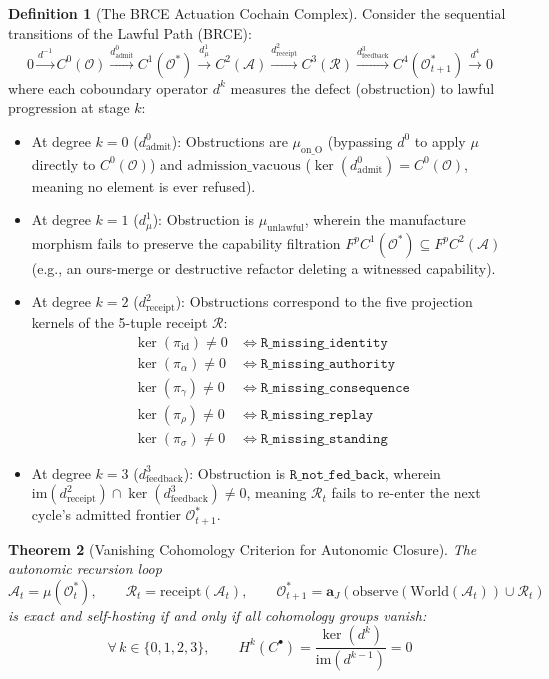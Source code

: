 \documentclass[10pt,twoside,openany]{book}
\theoremstyle{plain}
\newtheorem{theorem}{Theorem}[chapter]
\theoremstyle{definition}
\newtheorem{definition}[theorem]{Definition}
\theoremstyle{remark}
\newcommand{\Oraw}{\mathcal{O}}
\newcommand{\Oadm}{\mathcal{O}^*}
\newcommand{\Act}{\mathcal{A}}
\newcommand{\Rec}{\mathcal{R}}
\begin{document}
\begin{definition}[The BRCE Actuation Cochain Complex]
Consider the sequential transitions of the Lawful Path (BRCE):
\begin{equation}
0 \xrightarrow{d^{-1}} C^0(\Oraw) \xrightarrow{d^0_{\mathrm{admit}}} C^1(\Oadm) \xrightarrow{d^1_{\mu}} C^2(\Act) \xrightarrow{d^2_{\mathrm{receipt}}} C^3(\Rec) \xrightarrow{d^3_{\mathrm{feedback}}} C^4(\Oadm_{t+1}) \xrightarrow{d^4} 0
\end{equation}
where each coboundary operator $d^k$ measures the defect (obstruction) to lawful progression at stage $k$:
\begin{itemize}
    \item At degree $k=0$ ($d^0_{\mathrm{admit}}$): Obstructions are $\mu_{\mathrm{on\_O}}$ (bypassing $d^0$ to apply $\mu$ directly to $C^0(\Oraw)$) and $\mathrm{admission\_vacuous}$ ($\ker(d^0_{\mathrm{admit}}) = C^0(\Oraw)$, meaning no element is ever refused).
    \item At degree $k=1$ ($d^1_{\mu}$): Obstruction is $\mu_{\mathrm{unlawful}}$, wherein the manufacture morphism fails to preserve the capability filtration $F^p C^1(\Oadm) \subseteq F^p C^2(\Act)$ (e.g., an ours-merge or destructive refactor deleting a witnessed capability).
    \item At degree $k=2$ ($d^2_{\mathrm{receipt}}$): Obstructions correspond to the five projection kernels of the 5-tuple receipt $\Rec$:
    \begin{align}
        \ker(\pi_{\mathrm{id}}) \neq 0 &\iff \mathtt{R\_missing\_identity} \\
        \ker(\pi_{\alpha}) \neq 0 &\iff \mathtt{R\_missing\_authority} \\
        \ker(\pi_{\gamma}) \neq 0 &\iff \mathtt{R\_missing\_consequence} \\
        \ker(\pi_{\rho}) \neq 0 &\iff \mathtt{R\_missing\_replay} \\
        \ker(\pi_{\sigma}) \neq 0 &\iff \mathtt{R\_missing\_standing}
    \end{align}
    \item At degree $k=3$ ($d^3_{\mathrm{feedback}}$): Obstruction is $\mathtt{R\_not\_fed\_back}$, wherein $\mathrm{im}(d^2_{\mathrm{receipt}}) \cap \ker(d^3_{\mathrm{feedback}}) \neq 0$, meaning $\Rec_t$ fails to re-enter the next cycle's admitted frontier $\Oadm_{t+1}$.
\end{itemize}
\end{definition}

\begin{theorem}[Vanishing Cohomology Criterion for Autonomic Closure]
The autonomic recursion loop
\begin{equation}
\Act_t = \mu(\Oadm_t), \qquad \Rec_t = \mathrm{receipt}(\Act_t), \qquad \Oadm_{t+1} = \mathbf{a}_J(\mathrm{observe}(\mathrm{World}(\Act_t)) \cup \Rec_t)
\end{equation}
is exact and self-hosting if and only if all cohomology groups vanish:
\begin{equation}
\forall\, k \in \{0, 1, 2, 3\},\qquad H^k(C^\bullet) = \frac{\ker(d^k)}{\mathrm{im}(d^{k-1})} = 0
\end{equation}
\end{theorem}
\end{document}
